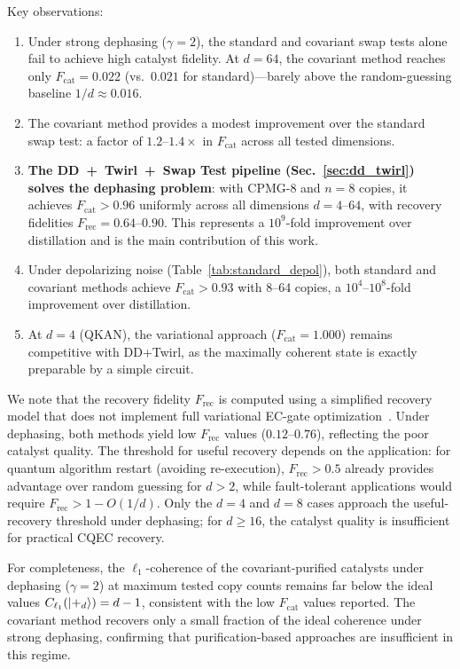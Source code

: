 \documentclass[prx,twocolumn,superscriptaddress,longbibliography,floatfix]{revtex4-2}
\begin{document}
Key observations:
\begin{enumerate}
\item Under strong dephasing ($\gamma = 2$), the standard and covariant swap tests alone fail to achieve high catalyst fidelity. At $d = 64$, the covariant method reaches only $F_\mathrm{cat} = 0.022$ (vs.\ $0.021$ for standard)---barely above the random-guessing baseline $1/d \approx 0.016$.
\item The covariant method provides a modest improvement over the standard swap test: a factor of $1.2$--$1.4\times$ in $F_\mathrm{cat}$ across all tested dimensions.
\item \textbf{The DD~+~Twirl~+~Swap Test pipeline (Sec.~\ref{sec:dd_twirl}) solves the dephasing problem}: with CPMG-8 and $n = 8$ copies, it achieves $F_\mathrm{cat} > 0.96$ uniformly across all dimensions $d = 4$--$64$, with recovery fidelities $F_\mathrm{rec} = 0.64$--$0.90$. This represents a $10^9$-fold improvement over distillation and is the main contribution of this work.
\item Under depolarizing noise (Table~\ref{tab:standard_depol}), both standard and covariant methods achieve $F_\mathrm{cat} > 0.93$ with 8--64 copies, a $10^4$--$10^8$-fold improvement over distillation.
\item At $d = 4$ (QKAN), the variational approach ($F_\mathrm{cat} = 1.000$) remains competitive with DD+Twirl, as the maximally coherent state is exactly preparable by a simple circuit.
\end{enumerate}

We note that the recovery fidelity $F_\mathrm{rec}$ is computed using a simplified recovery model that does not implement full variational EC-gate optimization~\cite{Wakaura2026}.
Under dephasing, both methods yield low $F_\mathrm{rec}$ values ($0.12$--$0.76$), reflecting the poor catalyst quality.
The threshold for useful recovery depends on the application: for quantum algorithm restart (avoiding re-execution), $F_\mathrm{rec} > 0.5$ already provides advantage over random guessing for $d > 2$, while fault-tolerant applications would require $F_\mathrm{rec} > 1 - O(1/d)$.
Only the $d = 4$ and $d = 8$ cases approach the useful-recovery threshold under dephasing; for $d \geq 16$, the catalyst quality is insufficient for practical CQEC recovery.

For completeness, the $\ell_1$-coherence of the covariant-purified catalysts under dephasing ($\gamma = 2$) at maximum tested copy counts remains far below the ideal values $C_{\ell_1}(\ket{+_d}) = d-1$, consistent with the low $F_\mathrm{cat}$ values reported.
The covariant method recovers only a small fraction of the ideal coherence under strong dephasing, confirming that purification-based approaches are insufficient in this regime.
\end{document}
